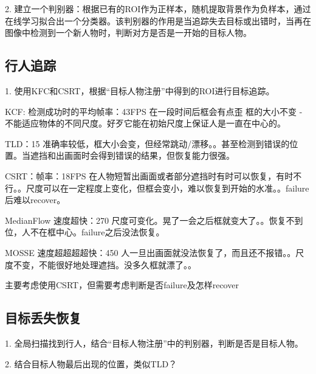 2. 建立一个判别器：根据已有的ROI作为正样本，随机提取背景作为负样本，通过在线学习拟合出一个分类器。该判别器的作用是当追踪失去目标或出错时，当再在图像中检测到一个新人物时，判断对方是否是一开始的目标人物。

\subsection{行人追踪}

1. 使用KFC和CSRT，根据“目标人物注册”中得到的ROI进行目标追踪。

KCF: 检测成功时的平均帧率：43FPS
在一段时间后框会有点歪
框的大小不变 - 不能适应物体的不同尺度。好歹它能在初始尺度上保证人是一直在中心的。

TLD：15
准确率较低，框大小会变，但经常跳动/漂移。。甚至检测到错误的位置。当遮挡和出画面时会得到错误的结果，但恢复能力很强。

CSRT：帧率：18FPS
在人物短暂出画面或者部分遮挡时有时可以恢复，有时不行。。尺度可以在一定程度上变化，但框会变小，难以恢复到开始的水准。。failure后难以recover。

MedianFlow
速度超快：270
尺度可变化。晃了一会之后框就变大了。。恢复不到位，人不在框中心。failure之后没法恢复。

MOSSE
速度超超超超快：450
人一旦出画面就没法恢复了，而且还不报错。。尺度不变，不能很好地处理遮挡。没多久框就漂了。。

主要考虑使用CSRT，但需要考虑判断是否failure及怎样recover

\subsection{目标丢失恢复}

1. 全局扫描找到行人，结合“目标人物注册”中的判别器，判断是否是目标人物。

2. 结合目标人物最后出现的位置，类似TLD？

